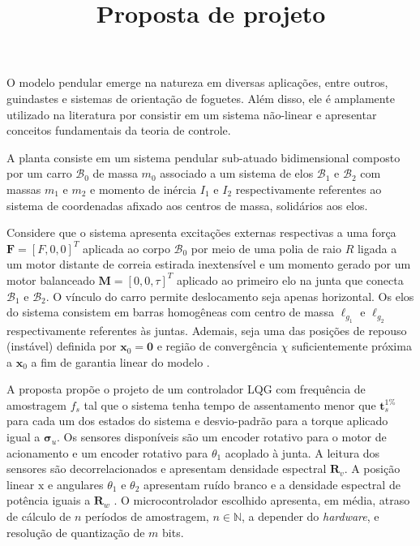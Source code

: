 \documentclass[a4paper, twoside]{article}
\title{Proposta de projeto}
\author{\studentname \qquad \uspid \qquad \uspmail}
\begin{document}
    
    \maketitle
    \thispagestyle{fancy}

    O modelo pendular emerge na natureza em diversas aplicações, entre outros, guindastes e sistemas de orientação de foguetes. Além disso, ele é amplamente utilizado na literatura por consistir em um sistema não-linear e apresentar conceitos fundamentais da teoria de controle. 
    
    A planta consiste em um sistema pendular sub-atuado bidimensional composto por um carro $\mathcal{B}_0$ de massa $m_0$ associado a um sistema de elos $\mathcal{B}_1$ e $\mathcal{B}_2$ com massas $m_1$ e $m_2$ e momento de inércia $I_1$ e $I_2$ respectivamente referentes ao sistema de coordenadas afixado aos centros de massa, solidários aos elos. 
    
    Considere que o sistema apresenta excitações externas respectivas a uma força $\mathbf{F} = [F, 0, 0]^T$ aplicada ao corpo $\mathcal{B}_0$ por meio de uma polia de raio $R$ ligada a um motor distante de correia estirada inextensível e um momento gerado por um motor balanceado $\mathbf{M} = [0, 0, \tau]^T$ aplicado ao primeiro elo na junta que conecta $\mathcal{B}_1$ e $\mathcal{B}_2$. O vínculo do carro permite deslocamento seja apenas horizontal. Os elos do sistema consistem em barras homogêneas com centro de massa $\ell_{g_1}$ e $\ell_{g_2}$ respectivamente referentes às juntas. Ademais, seja uma das posições de repouso (instável) definida por $\mathbf{x}_{0} = \mathbf{0}$ e região de convergência $\chi$ suficientemente próxima a $\mathbf{x}_{0}$ a fim de garantia linear do modelo \cite{Adamy2009}. 
    
    A proposta propõe o projeto de um controlador LQG com frequência de amostragem $f_s$ tal que o sistema tenha tempo de assentamento menor que $\mathbf{t}_s^{1\%}$ para cada um dos estados do sistema e desvio-padrão para a torque aplicado igual a $\mathbf{\sigma}_u$. Os sensores disponíveis são um encoder rotativo para o motor de acionamento e um encoder rotativo para $\theta_1$ acoplado à junta. A leitura dos sensores são decorrelacionados e apresentam densidade espectral $\mathbf{R}_v$. A posição linear $\mathrm{x}$ e angulares $\theta_1$ e $\theta_2$ apresentam ruído branco e a densidade espectral de potência iguais a $\mathbf{R}_w$ \cite{controle_digital_2018}. O microcontrolador escolhido apresenta, em média, atraso de cálculo de $n$ períodos de amostragem, $n \in \mathbb{N}$, a depender do \emph{hardware}, e resolução de quantização de $m$ bits.
    
\end{document}
